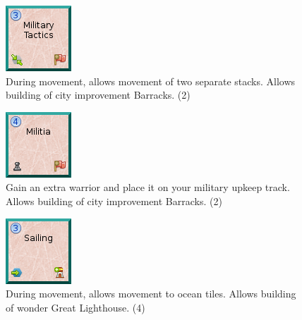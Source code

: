 \documentclass[11pt,a4paper,titlepage]{article}
\begin{document}
{{  \begin{figure}[!htb]
    \begin{minipage}[c]{0.1\textwidth}
      \includegraphics[scale=.7]{doe_tech_military_tactics.png}
    \end{minipage}\hfill
    \begin{minipage}[c]{0.6\textwidth}
      \captionsetup{labelformat=empty, justification=justified, singlelinecheck=false}
      \caption{During movement, allows movement of two separate stacks. Allows building of city improvement Barracks. (2)}
    \end{minipage}\hfill
    \label{fig:tech_military_tactics}
  \end{figure}

  \begin{figure}[!htb]
    \begin{minipage}[c]{0.1\textwidth}
      \includegraphics[scale=.7]{doe_tech_militia.png}
    \end{minipage}\hfill
    \begin{minipage}[c]{0.6\textwidth}
      \captionsetup{labelformat=empty, justification=justified, singlelinecheck=false}
      \caption{Gain an extra warrior and place it on your military upkeep track. Allows building of city improvement Barracks. (2)}
    \end{minipage}\hfill
    \label{fig:tech_militia}
  \end{figure}

  \begin{figure}[!htb]
    \begin{minipage}[c]{0.1\textwidth}
      \includegraphics[scale=.7]{doe_tech_sailing.png}
    \end{minipage}\hfill
    \begin{minipage}[c]{0.6\textwidth}
      \captionsetup{labelformat=empty, justification=justified, singlelinecheck=false}
      \caption{During movement, allows movement to ocean tiles. Allows building of wonder Great Lighthouse. (4)}
    \end{minipage}\hfill
    \label{fig:tech_sailing}
  \end{figure}

  }\label{subsec:red_technologies}

}\label{sec:technology_tiles}
\end{document}

